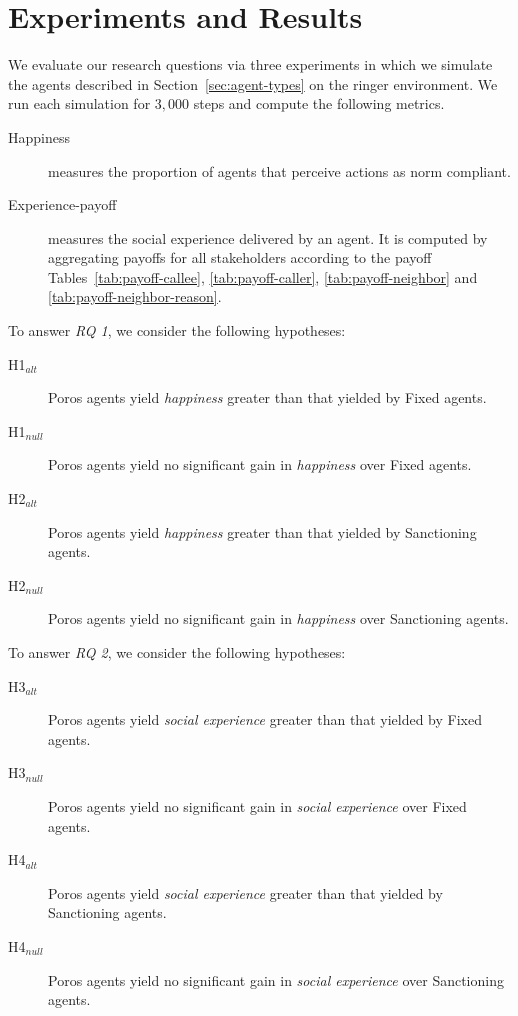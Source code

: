 \documentclass[11pt,          %
               phd,           %
               onehalfspacing %
               ]{ncsuthesis}
\newcommand{\fsl}{\textsl}
\newcommand{\frameworkB}{Poros\xspace}
\begin{document}
\section{Experiments and Results}
\label{sec:precious-experiments}

We evaluate our research questions via three experiments in which we
simulate the agents described in
Section~\ref{sec:agent-types} on the ringer environment. We run each
simulation for $3,000$ steps and compute the following metrics.

\begin{description}
\item[Happiness] measures the proportion of agents that perceive actions
as norm compliant.

\item[Experience-payoff] measures the social experience delivered by an agent. 
It is computed by aggregating payoffs for all stakeholders according to
the payoff Tables~\ref{tab:payoff-callee}, \ref{tab:payoff-caller},
\ref{tab:payoff-neighbor} and \ref{tab:payoff-neighbor-reason}.

\end{description}

To answer \fsl{RQ 1}, we consider the following hypotheses:
\begin{description}
\item[H1$_{alt}$] \frameworkB agents yield \fsl{happiness} greater than that yielded by Fixed agents.
\item[H1$_{null}$] \frameworkB agents yield no significant gain in \fsl{happiness} over Fixed agents.
\item[H2$_{alt}$] \frameworkB agents yield \fsl{happiness} greater than that yielded by Sanctioning agents.
\item[H2$_{null}$]  \frameworkB agents yield no significant gain in \fsl{happiness} over Sanctioning agents.
\end{description}

To answer \fsl{RQ 2}, we consider the following hypotheses:
\begin{description}
\item[H3$_{alt}$] \frameworkB agents yield \fsl{social experience} greater than that yielded by Fixed agents.
\item[H3$_{null}$] \frameworkB agents yield no significant gain in \fsl{social experience} over Fixed agents.
\item[H4$_{alt}$] \frameworkB agents yield \fsl{social experience} greater than that yielded by Sanctioning agents.
\item[H4$_{null}$]  \frameworkB agents yield no significant gain in \fsl{social experience} over Sanctioning agents.
\end{description}
\end{document}
